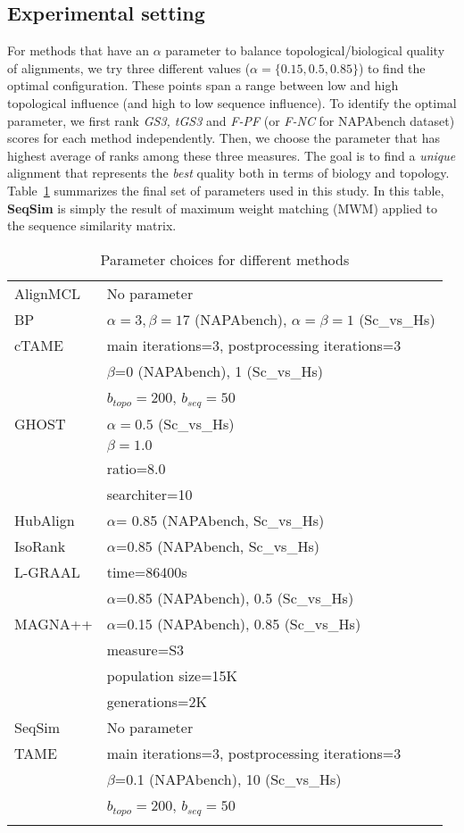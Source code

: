 \documentclass[10pt, journal, compsoc, final]{IEEEtran}
\begin{document}
\subsection{Experimental setting}
For methods that have an $\alpha$ parameter to balance topological/biological quality of alignments, we try three different values ($\alpha =\{ 0.15, 0.5, 0.85\}$) to find the optimal configuration. These points span a range between low and high topological influence (and high to low sequence influence).  To identify the optimal parameter, we first rank \textit{GS3, tGS3} and \textit{F-PF} (or \textit{F-NC} for NAPAbench dataset) scores for each method independently. Then, we choose the parameter that has highest average of ranks among these three measures. The goal is to find a \textit{unique} alignment that represents the \textit{best} quality both in terms of biology and topology. 
Table~\ref{table:params} summarizes the final set of parameters used in this study. In this table, \textbf{SeqSim} is simply the result of maximum weight matching (MWM) applied to the sequence similarity matrix.

\begin{table}[!h]
\centering
\begin{tabular}{ll}
 AlignMCL & No parameter\\ \addlinespace
 BP & $\alpha=3,\beta=17$ (NAPAbench), $\alpha=\beta=1$  (Sc\_vs\_Hs)\\ \addlinespace
 cTAME & main iterations=3, postprocessing iterations=3\\ &$\beta$=0 (NAPAbench), 1 (Sc\_vs\_Hs)\\ &$b_{topo}=200$, $b_{seq}=50$ \\ \addlinespace
 GHOST & $\alpha=0.5$ (Sc\_vs\_Hs)\\ & $\beta=1.0$ \\ & ratio=8.0 \\ &searchiter=10\\ \addlinespace
 HubAlign & $\alpha$= 0.85 (NAPAbench, Sc\_vs\_Hs) \\ \addlinespace
 IsoRank &  $\alpha$=0.85 (NAPAbench, Sc\_vs\_Hs) \\ \addlinespace
 L-GRAAL&time=86400s \\ &  $\alpha$=0.85 (NAPAbench), 0.5 (Sc\_vs\_Hs) \\  \addlinespace
 MAGNA++&  $\alpha$=0.15 (NAPAbench), 0.85 (Sc\_vs\_Hs) \\ & measure=S3\\&population size=15K\\&generations=2K\\ \addlinespace 
 SeqSim & No parameter\\ \addlinespace
 TAME & main iterations=3, postprocessing iterations=3\\ &$\beta$=0.1 (NAPAbench), 10 (Sc\_vs\_Hs)\\  &$b_{topo}=200$, $b_{seq}=50$ \\ \addlinespace
 
\end{tabular}
\caption{Parameter choices for different methods}
\label{table:params}
\end{table}
\end{document}

